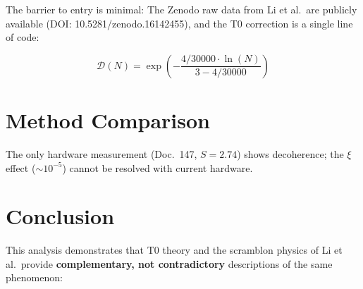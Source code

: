 The barrier to entry is minimal: The Zenodo raw data from Li et al.\ are publicly available (DOI: 10.5281/zenodo.16142455), and the T0 correction is a single line of code:

\begin{equation}
	\mathcal{D}(N) = \exp\left(-\frac{4/30000 \cdot \ln(N)}{3 - 4/30000}\right)
\end{equation}


\section{Method Comparison}
\label{sec:methods}

\begin{table}[h]
	\centering
	\caption{Systematic comparison: Scramblon theory vs.\ T0 projection}
	\label{tab:method_comparison}
\end{table}
The only hardware measurement (Doc.~147, $S = 2.74$) shows decoherence; the $\xi$ effect ($\sim 10^{-5}$) cannot be resolved with current hardware.


\section{Conclusion}
\label{sec:conclusion}

This analysis demonstrates that T0 theory and the scramblon physics of Li et al.\ provide \textbf{complementary, not contradictory} descriptions of the same phenomenon:

